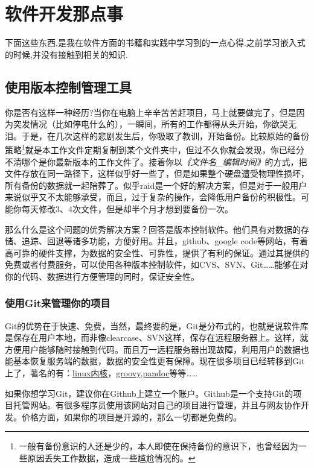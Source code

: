 \documentclass[a4paper]{book}
\newcommand{\chap}[1]{\newpage\thispagestyle{empty}\chapter{#1}\label{chap:\thechapter}}
\begin{document}
\chap{软件开发那点事}

下面这些东西,是我在软件方面的书籍和实践中学习到的一点心得.之前学习嵌入式的时候,并没有接触到相关的知识.

\section{使用版本控制管理工具}

你是否有这样一种经历?当你在电脑上辛辛苦苦赶项目，马上就要做完了，但是因为突发情况（比如停电什么的），一瞬间，所有的工作都得从头开始，你欲哭无泪。于是，在几次这样的悲剧发生后，你吸取了教训，开始备份。比较原始的备份策略\footnote{一般有备份意识的人还是少的，本人即使在保持备份的意识下，也曾经因为一些原因丢失工作数据，造成一些尴尬情况的。}就是本工作文件定期复制到某个文件夹中，但过不久你就会发现，你已经分不清哪个是你最新版本的工作文件了。接着你以\emph{《文件名\_编辑时间》}的方式，把文件存放在同一路径下，这样似乎好一些了，但是如果整个硬盘遭受物理性损坏，所有备份的数据就一起陪葬了。似乎raid是一个好的解决方案，但是对于一般用户来说似乎又不太能够承受，而且，过于复杂的操作，会降低用户备份的积极性。可能你每天修改3、4次文件，但是却半个月才想到要备份一次。

那么什么是这个问题的优秀解决方案？回答是版本控制软件。他们具有对数据的存储、追踪、回退等诸多功能，方便好用。并且，github、google code等网站，有着高可靠的硬件支撑，为数据的安全性、可靠性，提供了有利的保证。通过其提供的免费或者付费服务，可以使用各种版本控制软件，如CVS、SVN、Git\ldots{}\ldots{}能够在对你的代码、数据进行方便管理的同时，保证安全性。

\subsection{使用Git来管理你的项目}

Git的优势在于快速、免费，当然，最终要的是，Git是分布式的，也就是说软件库是保存在用户本地，而非像clearcase、SVN这样，保存在远程服务器上。这样，就方便用户能够随时接触到代码。而且万一远程服务器出现故障，利用用户的数据也能基本恢复服务端的数据，数据的安全性更有保障。现在很多项目已经转移到Git上了，著名的有：\href{https://github.com/torvalds/linux}{linux内核}，\href{https://github.com/groovy/groovy-core}{groovy},\href{https://github.com/jgm/pandoc}{pandoc}等等\ldots{}\ldots{}

如果你想学习Git，建议你在Github上建立一个账户。Github是一个支持Git的项目托管网站。有很多程序员使用该网站对自己的项目进行管理，并且与网友协作开发。价格方面，如果你的项目是开源的，那么一切都是免费的。
\end{document}
